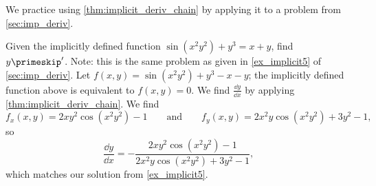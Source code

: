 We practice using \autoref{thm:implicit_deriv_chain} by applying it to a problem from \autoref{sec:imp_deriv}.

\begin{example}\label{ex_mchain5}%
Given the implicitly defined function $\sin(x^2y^2)+y^3=x+y$, find $y\primeskip'$. Note: this is the same problem as given in \autoref{ex_implicit5} of \autoref{sec:imp_deriv}.
\solution
Let $f(x,y) = \sin(x^2y^2)+y^3-x-y$; the implicitly defined function above is equivalent to $f(x,y)=0$. We find $\frac{\dd y}{\dd x}$ by applying \autoref{thm:implicit_deriv_chain}. We find 
\[f_x(x,y) = 2xy^2\cos(x^2y^2)-1\qquad \text{and}\qquad f_y(x,y) = 2x^2y\cos(x^2y^2)+3y^2-1,\]
so 
\[\frac{\dd y}{\dd x} = -\frac{2xy^2\cos(x^2y^2)-1}{2x^2y\cos(x^2y^2)+3y^2-1},\]
which matches our solution from \autoref{ex_implicit5}.
\end{example}


